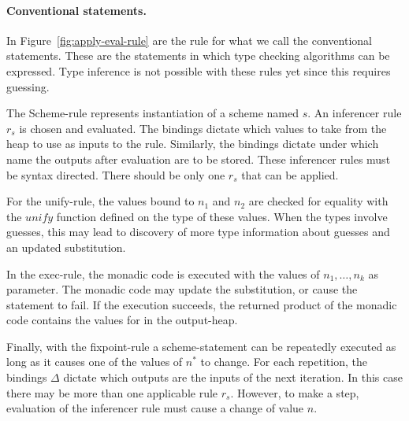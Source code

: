 \documentclass[preprint,natbib]{sigplanconf}
\newcommand{\Varid}[1]{\mathit{#1}}
\newcommand\Rule{r}
\newcommand\Bindings{\Delta}
\newcommand\SchemeName{s}
\newcommand\Idents[1]{{#1}^{\!*}}
\begin{document}
    \paragraph{Conventional statements.}
    In Figure~\ref{fig:apply-eval-rule} are the rule for what we call the conventional statements. These are the statements in which type checking algorithms
    can be expressed. Type inference is not possible with these rules yet since this requires guessing.

    The Scheme-rule represents instantiation of a scheme named $\SchemeName$. An inferencer rule $\Rule_{\SchemeName}$ is chosen and evaluated. The bindings
    dictate which values to take from the heap to use as inputs to the rule. Similarly, the bindings dictate under which name the outputs after evaluation
    are to be stored. These inferencer rules must be syntax directed. There should be only one $\Rule_{\SchemeName}$ that can be applied.

    For the unify-rule, the values bound to $n_1$ and $n_2$ are checked for equality with the \ensuremath{\Varid{unify}} function defined on the type of these values. When the
    types involve guesses, this may lead to discovery of more type information about guesses and an updated substitution.
    
    In the exec-rule, the monadic code is executed with the values of $n_1, \ldots, n_k$ as parameter. The monadic code may update the substitution, or
    cause the statement to fail. If the execution succeeds, the returned product of the monadic code contains the values for in the output-heap.
    
    Finally, with the fixpoint-rule a scheme-statement can be repeatedly executed as long as it causes one of the values of $\Idents{n}$ to change. For each repetition, the
    bindings $\Bindings$ dictate which outputs are the inputs of the next iteration. In this case there may be more than one applicable rule
    $\Rule_{\SchemeName}$. However, to make a step, evaluation of the inferencer rule must cause a change of value $n$.
\end{document}
